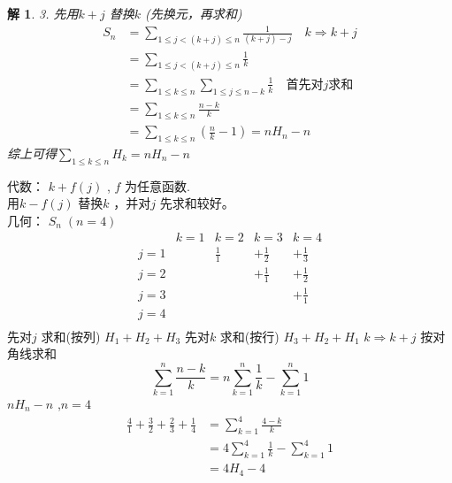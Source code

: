 \documentclass[mode=geye, chinesefont=founder]{elegantnote}
\newtheorem{solve}{解}
\begin{document}
\begin{solve}
    3. 先用$ k+j $ 替换$ k $ (先换元，再求和)
    \begin{align*}
        S_n 
        &= \sum_{1\leqslant j < (k+j)\leqslant n}\frac{1}{(k+j)-j} \quad k\Rightarrow k+j \\
        &= \sum_{1\leqslant j < (k+j)\leqslant n}\frac{1}{k} \\
        &= \sum_{1\leqslant k \leqslant n} \sum_{1\leqslant j \leqslant n-k}\frac{1}{k} \quad\text{首先对}j\text{求和} \\
        &= \sum_{1\leqslant k \leqslant n} \frac{n-k}{k}\\
        &= \sum_{1\leqslant k \leqslant n} \left( \frac{n}{k}-1 \right) = n H_n - n
    \end{align*}
    综上可得$ \sum_{1\leqslant k\leqslant n}H_k = n H_n - n $ 
\end{solve}
代数：
$ k+f(j) $ , $ f $ 为任意函数.\\
用$ k-f(j) $ 替换$ k $ ，并对$ j $ 先求和较好。\\
几何：
$ S_n \;(n=4) $ 
\begin{equation*}
    \begin{array}{ccccc}
            & k=1   & k=2   & k=3   & k=4   \\
        j=1 & & \frac{1}{1} & +\frac{1}{2} & +\frac{1}{3} \\
        j=2 & &             & +\frac{1}{1} & +\frac{1}{2} \\
        j=3 & &             &              & +\frac{1}{1} \\
        j=4 & &             &              &              \\
    \end{array}
\end{equation*}
先对$ j $ 求和(按列) $ H_1 + H_2 + H_3 $ 
先对$ k $ 求和(按行) $ H_3 + H_2 + H_1 $ 
$ k\Rightarrow k+j $ 按对角线求和 
\begin{equation*}
    \sum_{k=1}^{n}\frac{n-k}{k} = n \sum_{k=1}^{n}\frac{1}{k}-\sum_{k=1}^{n} 1
\end{equation*}
$ nH_n-n $ ,$ n=4 $ 
\begin{align*}
    \frac{4}{1}+\frac{3}{2}+\frac{2}{3}+\frac{1}{4} &= \sum_{k=1}^{4}\frac{4-k}{k} \\ 
    &= 4\sum_{k=1}^{4}\frac{1}{k}-\sum_{k=1}^{4} 1 \\
    &= 4H_4 - 4
\end{align*}
\end{document}
